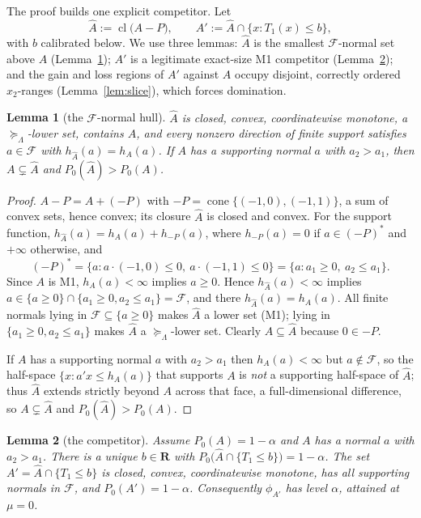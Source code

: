 \documentclass[12pt]{article}
\newtheorem{lemma}{Lemma}
\theoremstyle{remark}
\newcommand{\Lam}{\Lambda}
\newcommand{\R}{\mathbf R}
\newcommand{\Feas}{\mathcal F}
\newcommand{\sucL}{\succeq_\Lam}
\DeclareMathOperator{\cl}{cl}
\DeclareMathOperator{\cone}{cone}
\newcommand{\hA}{\widehat A}
\begin{document}
\medskip
The proof builds one explicit competitor. Let
\[
\hA:=\cl\big(A-P\big),\qquad A':=\hA\cap\{x:T_1(x)\le b\},
\]
with $b$ calibrated below. We use three lemmas: $\hA$ is the smallest $\Feas$-normal set above $A$ (Lemma~\ref{lem:hull}); $A'$ is a legitimate exact-size M1 competitor (Lemma~\ref{lem:comp}); and the gain and loss regions of $A'$ against $A$ occupy disjoint, correctly ordered $x_2$-ranges (Lemma~\ref{lem:slice}), which forces domination.

\begin{lemma}[the $\Feas$-normal hull]\label{lem:hull}
$\hA$ is closed, convex, coordinatewise monotone, a $\sucL$-lower set, contains $A$, and every nonzero direction of finite support satisfies $a\in\Feas$ with $h_{\hA}(a)=h_A(a)$. If $A$ has a supporting normal $a$ with $a_2>a_1$, then $A\subsetneq\hA$ and $P_0(\hA)>P_0(A)$.
\end{lemma}

\begin{proof}
$A-P=A+(-P)$ with $-P=\cone\{(-1,0),(-1,1)\}$, a sum of convex sets, hence convex; its closure $\hA$ is closed and convex. For the support function, $h_{\hA}(a)=h_A(a)+h_{-P}(a)$, where $h_{-P}(a)=0$ if $a\in(-P)^\ast$ and $+\infty$ otherwise, and
\[
(-P)^\ast=\{a:a\cdot(-1,0)\le0,\ a\cdot(-1,1)\le0\}=\{a:a_1\ge0,\ a_2\le a_1\}.
\]
Since $A$ is M1, $h_A(a)<\infty$ implies $a\ge0$. Hence $h_{\hA}(a)<\infty$ implies $a\in\{a\ge0\}\cap\{a_1\ge0,a_2\le a_1\}=\Feas$, and there $h_{\hA}(a)=h_A(a)$. All finite normals lying in $\Feas\subseteq\{a\ge0\}$ makes $\hA$ a lower set (M1); lying in $\{a_1\ge0,a_2\le a_1\}$ makes $\hA$ a $\sucL$-lower set. Clearly $A\subseteq\hA$ because $0\in -P$.

If $A$ has a supporting normal $a$ with $a_2>a_1$ then $h_A(a)<\infty$ but $a\notin\Feas$, so the half-space $\{x:a'x\le h_A(a)\}$ that supports $A$ is \emph{not} a supporting half-space of $\hA$; thus $\hA$ extends strictly beyond $A$ across that face, a full-dimensional difference, so $A\subsetneq\hA$ and $P_0(\hA)>P_0(A)$.
\end{proof}

\begin{lemma}[the competitor]\label{lem:comp}
Assume $P_0(A)=1-\alpha$ and $A$ has a normal $a$ with $a_2>a_1$. There is a unique $b\in\R$ with $P_0\big(\hA\cap\{T_1\le b\}\big)=1-\alpha$. The set $A'=\hA\cap\{T_1\le b\}$ is closed, convex, coordinatewise monotone, has all supporting normals in $\Feas$, and $P_0(A')=1-\alpha$. Consequently $\phi_{A'}$ has level $\alpha$, attained at $\mu=0$.
\end{lemma}
\end{document}
